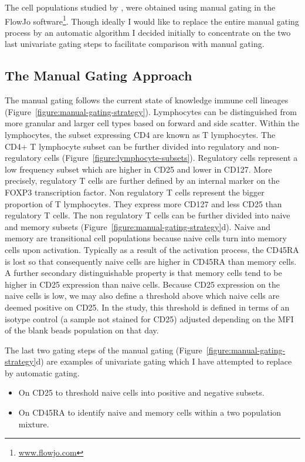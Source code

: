 
The cell populations studied by \citet{Dendrou:2009dv}, were obtained using manual gating in the FlowJo software\footnote{\url{www.flowjo.com}}.
Though ideally I would like to replace the entire manual gating process by an automatic algorithm I decided initially to concentrate on the two last univariate gating steps
to facilitate comparison with manual gating.


\subsection{The Manual Gating Approach }

The manual gating follows the current state of knowledge immune cell lineages (Figure~\ref{figure:manual-gating-strategy}).
Lymphocytes can be distinguished from more granular and larger cell types based on forward and side scatter.
Within the lymphocytes, the subset expressing CD4 are known as T lymphocytes.
The CD4+ T lymphocyte subset can be further divided into regulatory and non-regulatory cells (Figure~\ref{figure:lymphocyte-subsets}).
Regulatory cells represent a low frequency subset which are higher in CD25 and lower in CD127.
More precisely, regulatory T cells are further defined by an internal marker on the FOXP3 transcription factor.
Non regulatory T cells represent the bigger proportion of T lymphocytes.
They express more CD127 and less CD25 than regulatory T cells.
The non regulatory T cells can be further divided into naive and memory subsets (Figure~\ref{figure:manual-gating-strategy}d).
Naive and memory are transitional cell populations because naive cells turn into memory cells upon activation.
Typically as a result of the activation process, the CD45RA is lost so that consequently naive cells are higher in CD45RA than memory cells.
A further secondary distinguishable property is that memory cells tend to be higher in CD25 expression than naive cells.
Because CD25 expression on the naive cells is low, we may also define a threshold above which naive cells are deemed positive on CD25.
In the \citet{Dendrou:2009dv} study, this threshold is defined in terms of an isotype control (a sample not stained for CD25)
adjusted depending on the MFI of the blank beads population on that day.

The last two gating steps of the manual gating (Figure~\ref{figure:manual-gating-strategy}d) are examples of univariate gating which I have attempted to replace by automatic gating.
\begin{itemize} [noitemsep,topsep=0pt,parsep=0pt,partopsep=0pt]
\item On CD25 to threshold naive cells into positive and negative subsets.
\item On CD45RA to identify naive and memory cells within a two population mixture.
\end{itemize}

